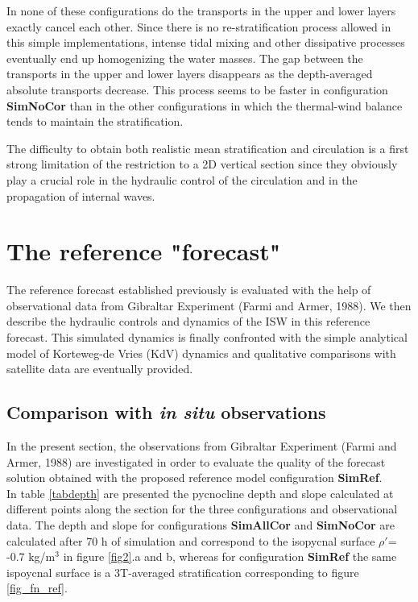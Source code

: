 \documentclass[a4paper,12pt]{article}
\begin{document}
In none of these configurations do the transports in the upper and lower layers exactly cancel each other. Since there is no re-stratification process allowed in this simple implementations, intense tidal mixing and other dissipative processes eventually end up homogenizing the water masses. The gap between the transports in the upper and lower layers  disappears as the depth-averaged absolute transports decrease. This process seems to be faster in configuration \textbf{SimNoCor} than in the other configurations in which the thermal-wind balance tends to maintain the stratification.

The difficulty to obtain both realistic mean stratification and circulation is a first strong limitation of the restriction to a 2D vertical section since they obviously play a crucial role in the hydraulic control of the circulation and in the propagation of internal waves.\\

\section{The reference "forecast"}

\indent The reference forecast  established previously is evaluated with the help of observational data from Gibraltar Experiment (Farmi and Armer, 1988). We then describe the hydraulic controls and dynamics of the ISW in this reference forecast. This simulated dynamics is finally confronted with the simple analytical model of Korteweg-de Vries (KdV) dynamics and qualitative comparisons with satellite data are eventually provided.

\subsection{Comparison with \textit{in situ} observations}
\label{refobs}
\indent In the present section, the observations from Gibraltar Experiment (Farmi and Armer, 1988) are investigated in order to evaluate the quality of the forecast solution obtained with the proposed reference model configuration \textbf{SimRef}.\\
In table \ref{tabdepth} %
are presented the pycnocline depth and slope calculated at different points along the section for the three configurations and observational data. The depth and slope for configurations \textbf{SimAllCor} and \textbf{SimNoCor} are calculated after 70 h of simulation and correspond to the isopycnal surface $\rho'$= -0.7 kg/m$^3$ in figure \ref{fig2}.a and b, whereas for configuration \textbf{SimRef} the same ispoycnal surface is a 3T-averaged stratification corresponding to figure \ref{fig_fn_ref}. 
\end{document}
